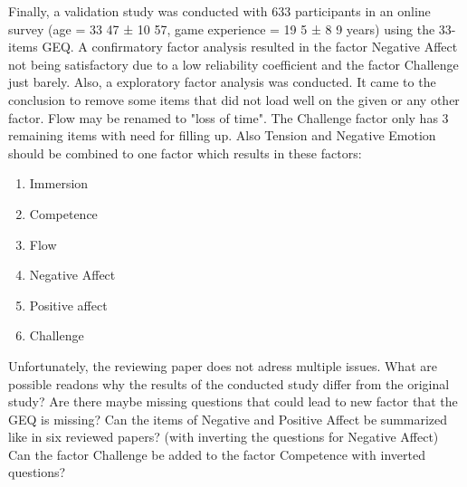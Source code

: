 Finally, a validation study was conducted with 633 participants in an online survey (age = 33 47 ± 10 57, game experience = 19 5 ± 8 9 years) using the 33-items GEQ. A confirmatory factor analysis resulted in the factor Negative Affect not being satisfactory due to a low reliability coefficient and the factor Challenge just barely. Also, a exploratory factor analysis was conducted. It came to the conclusion to remove some items that did not load well on the given or any other factor. Flow may be renamed to "loss of time". The Challenge factor only has 3 remaining items with need for filling up. Also Tension and Negative Emotion should be combined to one factor which results in these factors:
\begin{enumerate}
	\item Immersion
	\item Competence
	\item Flow
	\item Negative Affect
	\item Positive affect
	\item Challenge
\end{enumerate}

Unfortunately, the reviewing paper does not adress multiple issues.
What are possible readons why the results of the conducted study differ from the original study?
Are there maybe missing questions that could lead to new factor that the GEQ is missing?
Can the items of Negative and Positive Affect be summarized like in six reviewed papers? (with inverting the questions for Negative Affect)
Can the factor Challenge be added to the factor Competence with inverted questions?

